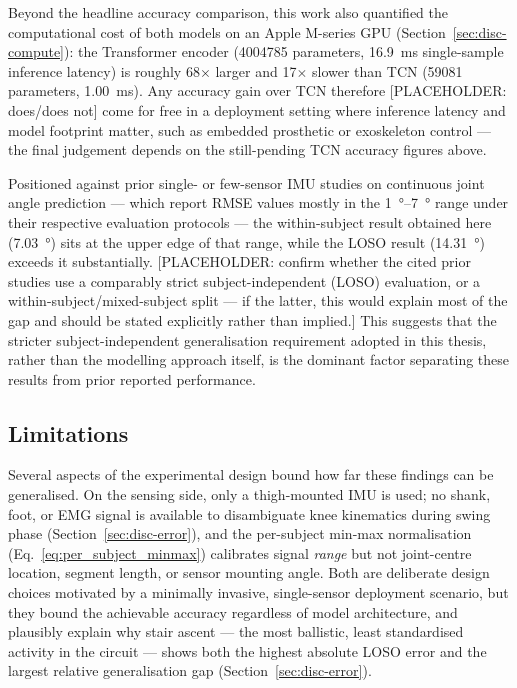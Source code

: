 Beyond the headline accuracy comparison, this work also quantified the
computational cost of both models on an Apple M-series GPU
(Section~\ref{sec:disc-compute}): the Transformer encoder
(\num{4004785} parameters, \SI{16.9}{\milli\second} single-sample inference
latency) is roughly \num{68}$\times$ larger and \num{17}$\times$ slower than
TCN (\num{59081} parameters, \SI{1.00}{\milli\second}). Any accuracy gain over
TCN therefore [PLACEHOLDER: does/does not] come for free in a deployment
setting where inference latency and model footprint matter, such as embedded
prosthetic or exoskeleton control — the final judgement depends on the
still-pending TCN accuracy figures above.

Positioned against prior single- or few-sensor IMU studies on continuous
joint angle prediction — which report RMSE values mostly in the
\SI{1}{\degree}--\SI{7}{\degree} range under their respective evaluation
protocols \citep{wangGaitSeamlessKnee2025, shahGaitSpeedTask2025,
sung2021prediction, thudor2025knee, huang2026multi} — the within-subject
result obtained here (\SI{7.03}{\degree}) sits at the upper edge of that
range, while the LOSO result (\SI{14.31}{\degree}) exceeds it substantially.
[PLACEHOLDER: confirm whether the cited prior studies use a comparably strict
subject-independent (LOSO) evaluation, or a within-subject/mixed-subject
split — if the latter, this would explain most of the gap and should be
stated explicitly rather than implied.] This suggests that the stricter
subject-independent generalisation requirement adopted in this thesis, rather
than the modelling approach itself, is the dominant factor separating these
results from prior reported performance.

\subsection{Limitations}\label{sec:conclusion-limitations}

Several aspects of the experimental design bound how far these findings can be
generalised. On the sensing side, only a thigh-mounted IMU is used; no shank,
foot, or EMG signal is available to disambiguate knee kinematics during swing
phase (Section~\ref{sec:disc-error}), and the per-subject min-max
normalisation (Eq.~\ref{eq:per_subject_minmax}) calibrates signal
\emph{range} but not joint-centre location, segment length, or sensor mounting
angle. Both are deliberate design choices motivated by a minimally invasive,
single-sensor deployment scenario, but they bound the achievable accuracy
regardless of model architecture, and plausibly explain why stair ascent — the
most ballistic, least standardised activity in the circuit — shows both the
highest absolute LOSO error and the largest relative generalisation gap
(Section~\ref{sec:disc-error}).

